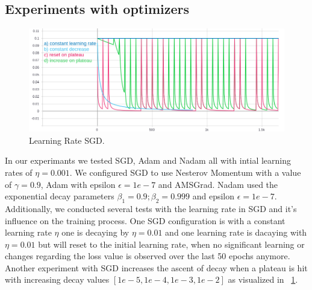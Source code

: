 \subsection{Experiments with optimizers}
\begin{figure}[H]
    \centering
    \includegraphics[width=\textwidth,height=\textheight,keepaspectratio]{img/learning_rate2.png}
    \decoRule
    \caption[Learning Rate SGD]{Learning Rate SGD.}
    \label{fig:sgd-learning-rate}
\end{figure}
In our experimants we tested SGD, Adam and Nadam all with intial learning rates of $\eta=0.001$.
We configured SGD to use Nesterov Momentum with a value of $\gamma=0.9$, Adam with  epsilon $\epsilon=1e-7$ and AMSGrad.
Nadam used the exponential decay parameters $\beta_1=0.9; \beta_2=0.999$ and epsilon $\epsilon=1e-7$.
Additionally, we conducted several tests with the learning rate in SGD and it's influence on the training process.
One SGD configuration is with a constant learning rate $\eta$ one is decaying by $\eta=0.01$ and one learning rate
is dacaying with $\eta=0.01$ but will reset to the initial learning rate, when no significant learning or changes regarding
the loss value is observed over the last 50 epochs anymore.
Another experiment with SGD increases the ascent of decay when a plateau is hit with increasing decay values
$[1e-5, 1e-4, 1e-3, 1e-2]$ as visualized in ~\ref{fig:sgd-learning-rate}.




%




